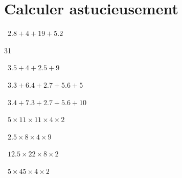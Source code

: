 	
	\section{Calculer astucieusement}
	
	\begin{questions}
		
	
		\question[2]  $\num{2.8} + 4 + 19 + \num{5.2}$
		\fillwithdottedlines{2cm}
		\begin{solution}
			31
		\end{solution}	 
		
		\question[2]  $\num{3.5} + 4 + \num{2.5} + 9$
		\fillwithdottedlines{2cm}
		\begin{solution}
			
		\end{solution}
			
		
		\question[2]  $\num{3.3} + \num{6.4} + \num{2.7} + \num{5.6} + 5 $
		\fillwithdottedlines{2cm}
		\begin{solution}

		\end{solution}
		
		\question[2]  $\num{3.4} + \num{7.3} + \num{2.7} + \num{5.6} + 10 $
		\fillwithdottedlines{2cm}
		\begin{solution}
			
		\end{solution}
	
	
		\question[2]  $\num{5} \times 11 \times 11 \times \num{4} \times 2$
		\fillwithdottedlines{2cm}
		\begin{solution}
			
		\end{solution}
	
		\question[2]  $\num{2.5} \times 8 \times 4 \times 9$
		\fillwithdottedlines{2cm}
		\begin{solution}
			
		\end{solution}
	
	
		
	
		\question[2]  $\num{12.5} \times 22 \times \num{8} \times 2$
		\fillwithdottedlines{2cm}
		\begin{solution}
			
		\end{solution}
	
	
		\question[2]  $\num{5} \times 45  \times \num{4} \times 2$
		\fillwithdottedlines{2cm}
		\begin{solution}
			

\end{solution}
\end{questions}
